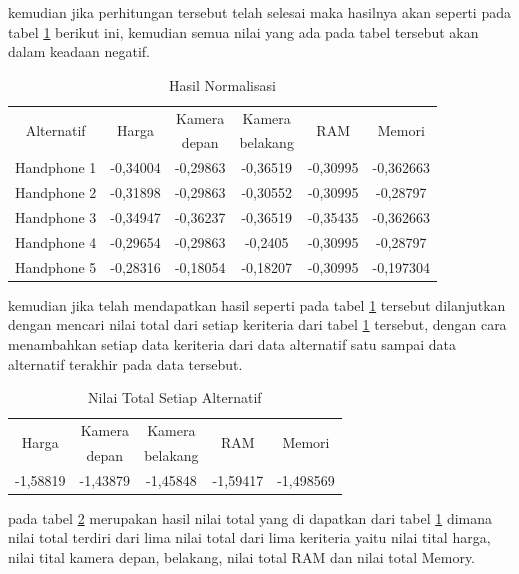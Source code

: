 kemudian jika perhitungan tersebut telah selesai maka hasilnya akan seperti pada tabel \ref{TA6} berikut ini, kemudian semua nilai yang ada pada tabel tersebut akan dalam keadaan negatif.
\pagebreak
\begin{table}[h]
\caption{Hasil Normalisasi}
\centering
\begin{tabular}{|c|c|c|c|c|c|}
\hline
\multirow{2}{*}{Alternatif} &\multirow{2}{*}{ Harga}& Kamera & Kamera&\multirow{2}{*}{RAM}& \multirow{2}{*}{Memori}\\
& & depan & belakang & &\\
\hline
Handphone 1 &-0,34004& -0,29863 &-0,36519 & -0,30995 & -0,362663\\
\hline
Handphone 2 &-0,31898 & -0,29863 & -0,30552 & -0,30995 & -0,28797\\
\hline
Handphone 3 &-0,34947 & -0,36237& -0,36519 & -0,35435 & -0,362663\\
\hline
Handphone 4 & -0,29654 & -0,29863& -0,2405 &-0,30995 & -0,28797\\
\hline
Handphone 5 &-0,28316 & -0,18054&-0,18207& -0,30995 & -0,197304\\
\hline
\end{tabular}
\label{TA6}
\end{table}

kemudian jika telah mendapatkan hasil seperti pada tabel \ref{TA6} tersebut dilanjutkan dengan mencari nilai total dari setiap keriteria dari tabel \ref{TA6} tersebut, dengan cara menambahkan setiap data keriteria dari data alternatif satu sampai data alternatif terakhir pada data tersebut.

\begin{table}[h]
\caption{Nilai Total Setiap Alternatif}
\centering
\begin{tabular}{|c|c|c|c|c|}
\hline
\multirow{2}{*}{ Harga}& Kamera & Kamera&\multirow{2}{*}{RAM}& \multirow{2}{*}{Memori}\\
& depan & belakang & &\\
\hline
-1,58819& -1,43879 & -1,45848 & -1,59417 & -1,498569\\
\hline

\end{tabular}
\label{TA7}
\end{table}

pada tabel \ref{TA7} merupakan hasil nilai total yang di dapatkan dari tabel \ref{TA6} dimana nilai total terdiri dari lima nilai total dari lima keriteria yaitu nilai tital harga, nilai tital kamera depan, belakang, nilai total RAM dan nilai total Memory.\par

